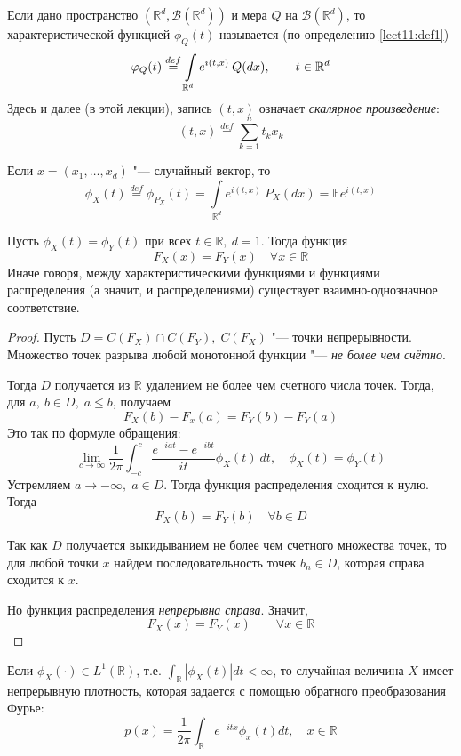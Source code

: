 Если дано пространство $(\mathbb{R}^d, \mathcal{B}(\mathbb{R}^d))$ и мера $Q$ на $\mathcal{B}(\mathbb{R}^d)$, то характеристической функцией $\phi_Q(t)$ называется (по определению \ref{lect11:def1})
$$\varphi_Q(t) \overset{def}{=} \int\limits_{\mathbb{R}^d} e^{i(t,x)} \:Q(dx), \qquad t\in \mathbb{R}^d$$
Здесь и далее (в этой лекции), запись $(t,x)$ означает \emph{скалярное произведение}:
$$(t,x) \overset{def}{=} \sum_{k=1}^n t_kx_k$$
\begin{nb}
    Если $x = (x_1, \ldots, x_d)$ "--- случайный вектор, то
    $$\phi_X(t) \overset{def}{=} \phi_{P_X}(t) = \int\limits_{\mathbb{R}^d} e^{i(t,x)}\:P_X(dx) = \mathbb{E} e^{i(t,x)}$$
\end{nb}
\begin{theorem}[Единственность] \label{lect12:th1}
    Пусть $\phi_X(t) = \phi_Y(t)$ при всех $t \in \mathbb{R},\: d = 1$. Тогда функция $$F_X(x) = F_Y(x)\quad \forall x\in \mathbb{R}$$ Иначе говоря, между характеристическими функциями и функциями распределения (а значит, и распределениями) существует взаимно-однозначное соответствие.
\begin{proof}
    Пусть $D = C(F_X) \cap C(F_Y), \;C(F_X)$ "--- точки непрерывности. Множество точек разрыва любой монотонной функции "--- \emph{не более чем счётно}.

    Тогда $D$ получается из $\mathbb{R}$ удалением не более чем счетного числа точек. Тогда, для $a, \: b \in D,\; a\leqslant b$, получаем
    $$F_X(b) - F_x(a) = F_Y(b) - F_Y(a)$$
    Это так по формуле обращения:
    $$\lim_{c\to \infty} \frac{1}{2\pi} \int_{-c}^c \frac{e^{-iat} - e^{-ibt}}{it} \phi_X(t)\: dt, \quad \phi_X(t) = \phi_Y(t)$$
    Устремляем $a \to -\infty,\; a\in D$. Тогда функция распределения сходится к нулю.
    Тогда $$F_X(b) = F_Y(b) \quad \forall b \in D$$

\parbox[b][1.1cm][t]{0.8\textwidth}{
Так как $D$ получается выкидыванием не более чем счетного множества точек, то для любой точки $x$ найдем последовательность точек $b_n \in D$, которая справа сходится к $x$.
}
\hfill
\parbox[b][1.1cm][t]{0.2\textwidth}{}
    
    Но функция распределения \emph{непрерывна справа}.
    Значит, $$F_X(x) = F_Y(x) \qquad \forall x \in \mathbb{R}$$
\end{proof}
\end{theorem}
\begin{theorem} \label{lect12:th2}
    Если $\phi_X(\cdot) \in L^1(\mathbb{R})$, т.е. $\int_{\mathbb{R}} |\phi_X(t)| dt < \infty$, то случайная величина $X$ имеет непрерывную плотность, которая задается с помощью обратного преобразования Фурье:
    $$p(x) = \frac{1}{2\pi}\int_\mathbb{R} e^{-itx} \phi_x(t) dt,\quad x\in \mathbb{R} $$
\end{theorem}
